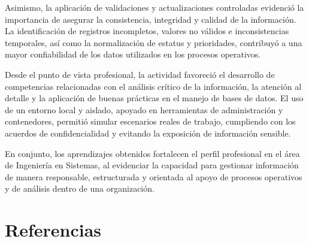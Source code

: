 \documentclass[12pt]{article}
\begin{document}
Asimismo, la aplicación de validaciones y actualizaciones controladas evidenció la importancia de asegurar la consistencia, integridad y calidad de la información. La identificación de registros incompletos, valores no válidos e inconsistencias temporales, así como la normalización de estatus y prioridades, contribuyó a una mayor confiabilidad de los datos utilizados en los procesos operativos.

Desde el punto de vista profesional, la actividad favoreció el desarrollo de competencias relacionadas con el análisis crítico de la información, la atención al detalle y la aplicación de buenas prácticas en el manejo de bases de datos. El uso de un entorno local y aislado, apoyado en herramientas de administración y contenedores, permitió simular escenarios reales de trabajo, cumpliendo con los acuerdos de confidencialidad y evitando la exposición de información sensible.

En conjunto, los aprendizajes obtenidos fortalecen el perfil profesional en el área de Ingeniería en Sistemas, al evidenciar la capacidad para gestionar información de manera responsable, estructurada y orientada al apoyo de procesos operativos y de análisis dentro de una organización.


\section*{Referencias}
\end{document}

